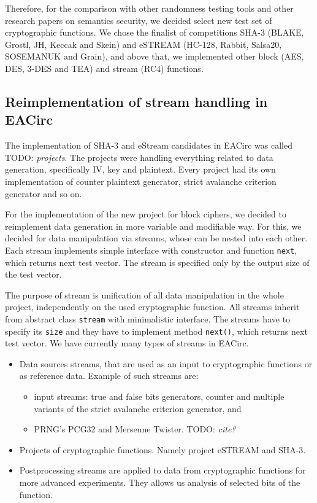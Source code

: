 \documentclass[
  print, %
  Table,   %
  nolof,     %
  nolot,     %
  11pt, %
  oneside  %
]{fithesis3}
\newcommand{\todo}[1]{TODO: \textit{#1}}
\begin{document}
Therefore, for the comparison with other randomness testing tools and other research papers on semantics security, we decided select new test set of cryptographic functions. We chose the finalist of competitions SHA-3 (BLAKE, Grostl, JH, Keccak and Skein) and eSTREAM (HC-128, Rabbit, Salsa20, SOSEMANUK and Grain), and above that, we implemented other block (AES, DES, 3-DES and TEA) and stream (RC4) functions.

\subsection{Reimplementation of stream handling in EACirc}
\label{subsec:method-data-streams}

The implementation of SHA-3 and eStream candidates in EACirc was called \todo{projects}. The projects were handling everything related to data generation, specifically IV, key and plaintext. Every project had its own implementation of counter plaintext generator, strict avalanche criterion generator and so on.

For the implementation of the new project for block ciphers, we decided to reimplement data generation in more variable and modifiable way. For this, we decided for data manipulation via streams, whose can be nested into each other. Each stream implements simple interface with constructor and function \texttt{next}, which returns next test vector. The stream is specified only by the output size of the test vector.

The purpose of stream is unification of all data manipulation in the whole project, independently on the used cryptographic function. All streams inherit from abstract class \texttt{stream} with minimalistic interface. The streams have to specify its \texttt{size} and they have to implement method \texttt{next()}, which returns next test vector. We have currently many types of streams in EACirc.

\begin{itemize}
    \item Data sources streams, that are used as an input to cryptographic functions or as reference data. Example of such streams are:
    \begin{itemize}
        \item input streams: true and false bits generators, counter and multiple variants of the strict avalanche criterion generator, and
        \item PRNG's PCG32 and Mersenne Twister. \todo{cite?}
    \end{itemize}
    \item Projects of cryptographic functions. Namely project eSTREAM and SHA-3.
    \item Postprocessing streams are applied to data from cryptographic functions for more advanced experiments. They allows us analysis of selected bits of the function.
\end{itemize}
\end{document}

